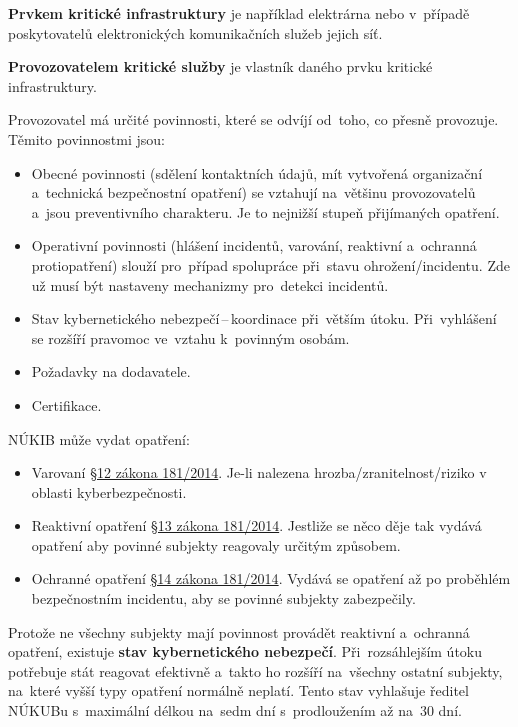 \textbf{Prvkem kritické infrastruktury} je například elektrárna nebo v~případě poskytovatelů elektronických komunikačních služeb jejich síť.

\textbf{Provozovatelem kritické služby} je vlastník daného prvku kritické infrastruktury.

Provozovatel má určité povinnosti, které se odvíjí od~toho, co přesně provozuje. Těmito povinnostmi jsou:

\begin{itemize}
    \item Obecné povinnosti (sdělení kontaktních údajů, mít vytvořená organizační a~technická bezpečnostní opatření) se vztahují na~většinu provozovatelů a~jsou preventivního charakteru. Je to nejnižší stupeň přijímaných opatření.
    \item Operativní povinnosti (hlášení incidentů, varování, reaktivní a~ochranná protiopatření) slouží pro~případ spolupráce při~stavu ohrožení/incidentu. Zde už musí být nastaveny mechanizmy pro~detekci incidentů.
    \item Stav kybernetického nebezpečí\,--\,koordinace při~větším útoku. Při~vyhlášení se rozšíří pravomoc ve~vztahu k~povinným osobám.
    \item Požadavky na dodavatele.
    \item Certifikace.
\end{itemize}

NÚKIB může vydat opatření:

\begin{itemize}
    \item Varovaní \href{https://www.zakonyprolidi.cz/cs/2014-181#p12}{§12 zákona 181/2014}. Je-li nalezena hrozba/zranitelnost/riziko v oblasti kyberbezpečnosti.
    \item Reaktivní opatření \href{https://www.zakonyprolidi.cz/cs/2014-181#p13}{§13 zákona 181/2014}. Jestliže se něco děje tak vydává opatření aby povinné subjekty reagovaly určitým způsobem.
    \item Ochranné opatření \href{https://www.zakonyprolidi.cz/cs/2014-181#p14}{§14 zákona 181/2014}. Vydává se opatření až po proběhlém bezpečnostním incidentu, aby se povinné subjekty zabezpečily.
\end{itemize}

Protože ne všechny subjekty mají povinnost provádět reaktivní a~ochranná opatření, existuje \textbf{stav kybernetického nebezpečí}. Při~rozsáhlejším útoku potřebuje stát reagovat efektivně a~takto ho rozšíří na~všechny ostatní subjekty, na~které vyšší typy opatření normálně neplatí. Tento stav vyhlašuje ředitel NÚKUBu s~maximální délkou na~sedm dní s~prodloužením až na~30 dní.

